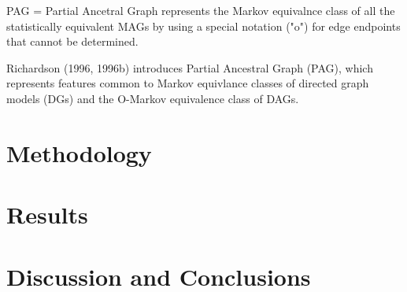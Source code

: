 \documentclass[11pt]{article}
\theoremstyle{definition}
\begin{document}
PAG = Partial Ancetral Graph represents the Markov equivalnce class of all the statistically equivalent MAGs by using a special notation ("o") for edge endpoints that cannot be determined. 


Richardson (1996, 1996b) introduces Partial Ancestral Graph (PAG), which represents features common to Markov equivlance classes of directed graph models (DGs) and the O-Markov equivalence class of DAGs.  

\section{Methodology}

\section{Results}


\section{Discussion and Conclusions}


\medskip

 
\end{document}
